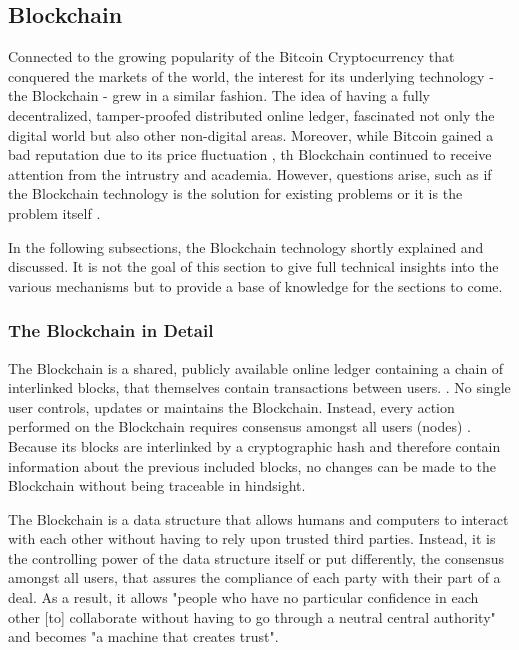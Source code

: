\subsection{Blockchain}
\label{subsec:02_Blockchain}

Connected to the growing popularity of the Bitcoin Cryptocurrency that conquered the markets of the world, the interest for its underlying technology - the Blockchain - grew in a similar fashion. The idea of having a fully decentralized, tamper-proofed distributed online ledger, fascinated not only the digital world but also other non-digital areas. Moreover, while Bitcoin gained a bad reputation due to its price fluctuation \cite{Shackelford2016}, th Blockchain continued to receive attention from the intrustry and academia. However, questions arise, such as  if the Blockchain technology is the solution for existing problems or it is the problem itself \cite{Stinchcombe2017, Nielsen2018, Lunn2015}.

In the following subsections, the Blockchain technology shortly explained and discussed. It is not the goal of this section to give full technical insights into the various mechanisms but to provide a base of knowledge for the sections to come.

\subsubsection{The Blockchain in Detail}
The Blockchain is a shared, publicly available online ledger containing a chain of interlinked blocks, that themselves contain transactions between users. \cite{Wust2017}. No single user controls, updates or maintains the Blockchain. Instead, every action performed on the Blockchain requires consensus amongst all users (nodes) \cite{Shackelford2016}. Because its blocks are interlinked by a cryptographic hash and therefore contain information about the previous included blocks, no changes can be made to the Blockchain without being traceable in hindsight.

The Blockchain is a data structure that allows humans and computers to interact with each other without having to rely upon trusted third parties. Instead, it is the controlling power of the data structure itself or put differently, the consensus amongst all users, that assures the compliance of each party with their part of a deal. As a result, it allows "people who have no particular confidence in each other [to] collaborate without having to go through a neutral central authority" and becomes "a machine that creates trust". \cite{Economist2015} \cite{Shackelford2016}

